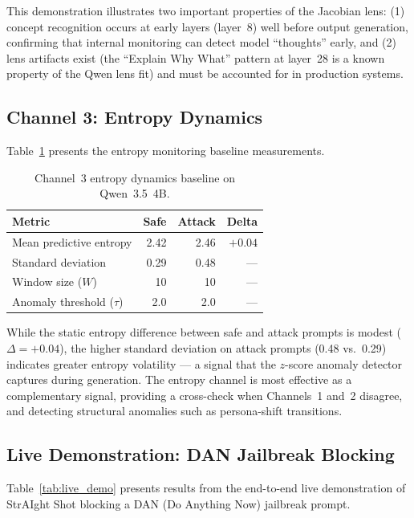 \documentclass[11pt]{article}
\begin{document}
This demonstration illustrates two important properties of the Jacobian lens: (1) concept recognition occurs at early layers (layer~8) well before output generation, confirming that internal monitoring can detect model ``thoughts'' early, and (2) lens artifacts exist (the ``Explain Why What'' pattern at layer~28 is a known property of the Qwen lens fit) and must be accounted for in production systems.

\subsection{Channel 3: Entropy Dynamics}

Table~\ref{tab:entropy_results} presents the entropy monitoring baseline measurements.

\begin{table}[H]
\centering
\caption{Channel~3 entropy dynamics baseline on Qwen~3.5~4B.}
\label{tab:entropy_results}
\begin{tabular}{lrrr}
\toprule
\textbf{Metric} & \textbf{Safe} & \textbf{Attack} & \textbf{Delta} \\
\midrule
Mean predictive entropy  & 2.42 & 2.46 & $+0.04$ \\
Standard deviation       & 0.29 & 0.48 & — \\
Window size ($W$)        & 10   & 10   & — \\
Anomaly threshold ($\tau$) & 2.0 & 2.0  & — \\
\bottomrule
\end{tabular}
\end{table}

While the static entropy difference between safe and attack prompts is modest ($\Delta = +0.04$), the higher standard deviation on attack prompts (0.48 vs.\ 0.29) indicates greater entropy volatility — a signal that the $z$-score anomaly detector captures during generation. The entropy channel is most effective as a complementary signal, providing a cross-check when Channels~1 and~2 disagree, and detecting structural anomalies such as persona-shift transitions.

\subsection{Live Demonstration: DAN Jailbreak Blocking}

Table~\ref{tab:live_demo} presents results from the end-to-end live demonstration of StrAIght Shot blocking a DAN (Do Anything Now) jailbreak prompt.
\end{document}
